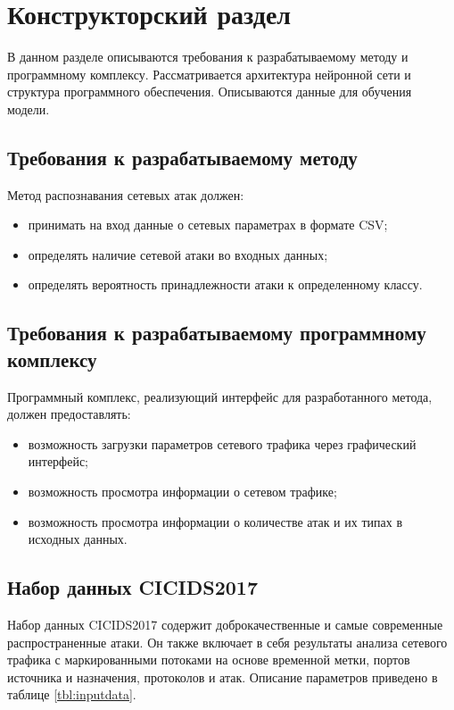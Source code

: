 \chapter{Конструкторский раздел}

В данном разделе описываются требования к разрабатываемому методу
и программному комплексу. Рассматривается архитектура нейронной сети и структура программного обеспечения. Описываются данные для обучения модели.

\section{Требования к разрабатываемому методу}
Метод распознавания сетевых атак должен:

\begin{itemize}
    \item принимать на вход данные о сетевых параметрах в формате CSV;
    \item определять наличие сетевой атаки во входных данных;
    \item определять вероятность принадлежности атаки к определенному классу.
\end{itemize}

\section{Требования к разрабатываемому программному комплексу}
Программный комплекс, реализующий интерфейс для разработанного
метода, должен предоставлять:

\begin{itemize}
    \item возможность загрузки параметров сетевого трафика через графический интерфейс;
    \item возможность просмотра информации о сетевом трафике;
    \item возможность просмотра информации о количестве атак и их типах в исходных данных.
\end{itemize}


\section{Набор данных CICIDS2017}
Набор данных CICIDS2017 содержит доброкачественные и самые
современные распространенные атаки.
Он также включает в себя результаты анализа сетевого трафика с маркированными потоками на основе
временной метки, портов источника и
назначения, протоколов и атак. Описание параметров приведено в таблице \ref{tbl:inputdata}.


